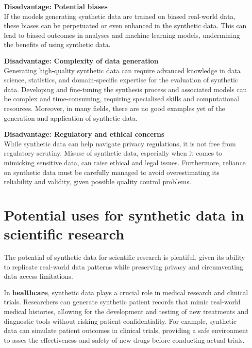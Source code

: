 \textbf{Disadvantage: Potential biases}\\
If the models generating synthetic data are trained on biased real-world data, these biases can be perpetuated or even enhanced in the synthetic data. This can lead to biased outcomes in analyses and machine learning models, undermining the benefits of using synthetic data. 

\textbf{Disadvantage: Complexity of data generation}\\
Generating high-quality synthetic data can require advanced knowledge in data science, statistics, and domain-specific expertise for the evaluation of synthetic data. Developing and fine-tuning the synthesis process and associated models can be complex and time-consuming, requiring specialised skills and computational resources. Moreover, in many fields, there are no good examples yet of the generation and application of synthetic data.

\textbf{Disadvantage: Regulatory and ethical concerns}\\
While synthetic data can help navigate privacy regulations, it is not free from regulatory scrutiny. Misuse of synthetic data, especially when it comes to mimicking sensitive data, can raise ethical and legal issues. Furthermore, reliance on synthetic data must be carefully managed to avoid overestimating its reliability and validity, given possible quality control problems. 


\section{Potential uses for synthetic data in scientific research}

The potential of synthetic data for scientific research is plentiful, given its ability to replicate real-world data patterns while preserving privacy and circumventing data access limitations.

In \textbf{healthcare}, synthetic data plays a crucial role in medical research and clinical trials. Researchers can generate synthetic patient records that mimic real-world medical histories, allowing for the development and testing of new treatments and diagnostic tools without risking patient confidentiality. For example, synthetic data can simulate patient outcomes in clinical trials, providing a safe environment to asses the effectiveness and safety of new drugs before conducting actual trials. \cite{gonzales2023synthetic,arora2022generative,braddon2023exploring}


